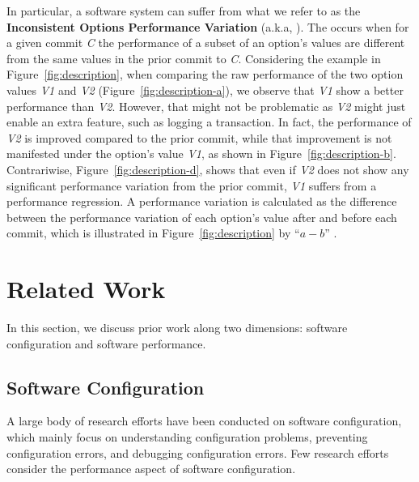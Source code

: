 In particular, a software system can suffer from what we refer to as the \textbf{Inconsistent Options Performance Variation} (a.k.a, \inconsistent). The \inconsistent occurs when for a given commit \emph{C} the performance of a subset of an option's values are different from the same values in the prior commit to \emph{C}. Considering the example in Figure~\ref{fig:description}, when comparing the raw performance of the two option values \emph{V1} and \emph{V2} (Figure~\ref{fig:description-a}), we observe that \emph{V1} show a better performance than \emph{V2}. However, that might not be problematic as \emph{V2} might just enable an extra feature, such as logging a transaction. In fact, the performance of \emph{V2} is improved compared to the prior commit, while that improvement is not manifested under the option's value \emph{V1}, as shown in Figure~\ref{fig:description-b}. %
Contrariwise, Figure~\ref{fig:description-d}, shows that even if \emph{V2} does not show any significant performance variation from the prior commit, \emph{V1} suffers from a performance regression. 
A performance variation is calculated as the difference between the performance variation of each option's value after and before each commit, which is illustrated in Figure~\ref{fig:description} by ``$a - b$'' .

\section{Related Work}
\label{sec:relatedwork}

In this section, we discuss prior work along two dimensions: software configuration and software performance. %

\subsection{Software Configuration}

A large body of research efforts have been conducted on software configuration, which mainly focus on understanding configuration problems, preventing configuration errors, and debugging configuration errors. Few research efforts consider the performance aspect of software configuration. 

